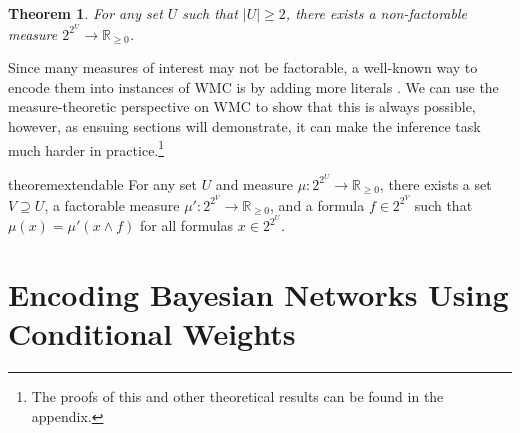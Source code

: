 \documentclass{uai2021} %
\newtheorem{theorem}{Theorem}
\theoremstyle{definition}
\begin{document}
\begin{theorem}
  For any set $U$ such that $|U| \ge 2$, there exists a non-factorable measure
  $2^{2^{U}} \to \mathbb{R}_{\ge 0}$.
\end{theorem}

Since many measures of interest may not be factorable, a well-known way to
encode them into instances of WMC is by adding more literals
\citep{DBLP:journals/ai/ChaviraD08}. We can use the measure-theoretic
perspective on WMC to show that this is always possible, however, as ensuing
sections will demonstrate, it can make the inference task much harder in
practice.\footnote{The proofs of this and other theoretical results can be found
  in the appendix.}

\begin{restatable}{theorem}{extendable}
  For any set $U$ and measure $\mu\colon 2^{2^U} \to \mathbb{R}_{\ge 0}$, there
  exists a set $V \supseteq U$, a factorable measure $\mu'\colon 2^{2^V} \to
  \mathbb{R}_{\ge 0}$, and a formula $f \in 2^{2^V}$ such that $\mu(x) = \mu'(x
  \land f)$ for all formulas $x \in 2^{2^U}$.
\end{restatable}

\section{Encoding Bayesian Networks Using Conditional Weights} \label{sec:bns}
\end{document}
